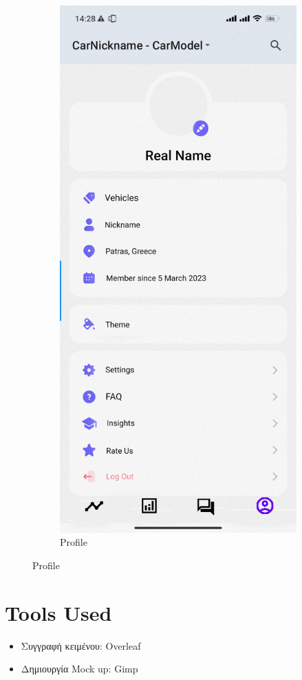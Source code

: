 \documentclass[11pt]{scrartcl} %
\begin{document}
\begin{figure}[!htb]
\begin{subfigure}{.5\textwidth}
  \includegraphics[width=.6\linewidth]{assets/profile_mock_up.jpg}
  \caption{Profile}
  \label{fig:sfig4}
\end{subfigure}
\label{fig:fig}
\end{figure}

\section{Tools Used}
\begin{itemize}
    \item Συγγραφή κειμένου: Overleaf
    \item Δημιουργία Mock up: Gimp
\end{itemize}


\end{document}
